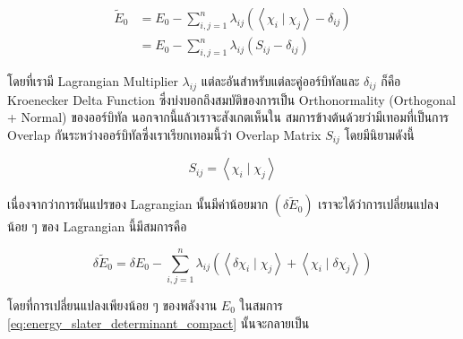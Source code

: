 \begin{equation}
  \begin{aligned}
    \tilde{E}_0
     & = E_0-\sum_{i, j=1}^n
    \lambda_{i j} \left(\left\langle\chi_i \mid \chi_j\right\rangle-\delta_{i j}\right) \\
     & = E_0-\sum_{i, j=1}^n
    \lambda_{i j} \left(S_{i j}-\delta_{i j}\right)
  \end{aligned}
\end{equation}

\noindent โดยที่เรามี Lagrangian Multiplier $\lambda_{i j}$ แต่ละอันสำหรับแต่ละคู่ออร์บิทัลและ $\delta_{i j}$ ก็คือ Kroenecker
Delta Function ซึ่งบ่งบอกถึงสมบัติของการเป็น Orthonormality (Orthogonal + Normal) ของออร์บิทัล นอกจากนี้แล้วเราจะสังเกตเห็นใน%
สมการข้างต้นด้วยว่ามีเทอมที่เป็นการ Overlap กันระหว่างออร์บิทัลซึ่งเราเรียกเทอมนี้ว่า Overlap Matrix $S_{i j}$ โดยมีนิยามดังนี้

\begin{equation}
  S_{i j}
  =
  \left\langle\chi_i \mid \chi_j\right\rangle
\end{equation}

\noindent เนื่องจากว่าการผันแปรของ Lagrangian นั้นมีค่าน้อยมาก $(\delta \tilde{E}_0)$ เราจะได้ว่าการเปลี่ยนแปลงน้อย ๆ ของ
Lagrangian นี้มีสมการคือ

\begin{equation}
  \label{eq:small_variation_energy_1}
  \delta \tilde{E}_0
  = \delta E_0
  - \sum_{i, j=1}^n \lambda_{i j}
  \left(
  \left\langle\delta \chi_i \mid \chi_j\right\rangle
  + \left\langle\chi_i \mid \delta \chi_j\right\rangle
  \right)
\end{equation}

\noindent โดยที่การเปลี่ยนแปลงเพียงน้อย ๆ ของพลังงาน $E_0$ ในสมการ \eqref{eq:energy_slater_determinant_compact}
นั้นจะกลายเป็น

